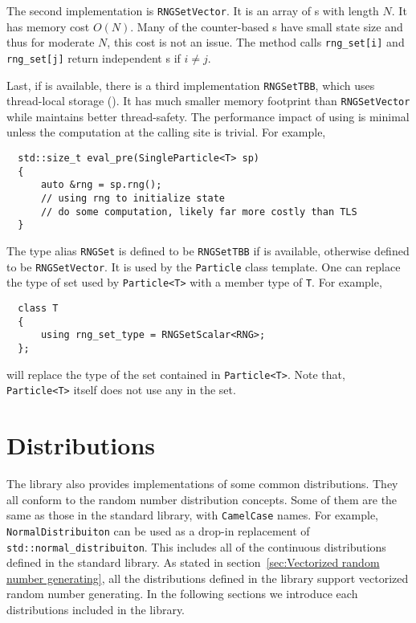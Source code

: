 The second implementation is \verb|RNGSetVector|. It is an array of \rng{}s
with length $N$. It has memory cost $O(N)$. Many of the counter-based \rng{}s
have small state size and thus for moderate $N$, this cost is not an issue. The
method calls \verb|rng_set[i]| and \verb|rng_set[j]| return independent \rng{}s
if $i \ne j$.

Last, if \tbb is available, there is a third implementation \verb|RNGSetTBB|,
which uses thread-local storage (\tls). It has much smaller memory footprint
than \verb|RNGSetVector| while maintains better thread-safety. The performance
impact of using \tls is minimal unless the computation at the calling site is
trivial. For example,
\begin{Verbatim}
  std::size_t eval_pre(SingleParticle<T> sp)
  {
      auto &rng = sp.rng();
      // using rng to initialize state
      // do some computation, likely far more costly than TLS
  }
\end{Verbatim}
The type alias \verb|RNGSet| is defined to be \verb|RNGSetTBB| if \tbb is
available, otherwise defined to be \verb|RNGSetVector|. It is used by the
\verb|Particle| class template. One can replace the type of \rng set used by
\verb|Particle<T>| with a member type of \verb|T|. For example,
\begin{Verbatim}
  class T
  {
      using rng_set_type = RNGSetScalar<RNG>;
  };
\end{Verbatim}
will replace the type of the \rng set contained in \verb|Particle<T>|. Note
that, \verb|Particle<T>| itself does not use any \rng in the set.

\section{Distributions}
\label{sec:Distributions}

The library also provides implementations of some common distributions. They
all conform to the \cppoo random number distribution concepts. Some of them are
the same as those in the \cppoo standard library, with \verb|CamelCase| names.
For example, \verb|NormalDistribuiton| can be used as a drop-in replacement of
\verb|std::normal_distribuiton|. This includes all of the continuous
distributions defined in the standard library. As stated in
section~\ref{sec:Vectorized random number generating}, all the distributions
defined in the library support vectorized random number generating. In the
following sections we introduce each distributions included in the library.

